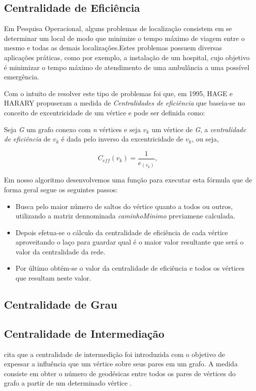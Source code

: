 \documentclass[12pt]{article}
\begin{document}
\subsection{Centralidade de Eficiência}
Em  Pesquisa  Operacional,  alguns  problemas  de  localização  consistem  em  se determinar um local de modo que minimize o tempo máximo de viagem entre o mesmo e todas as demais localizações.Estes problemas possuem diversas aplicações práticas, como  por  exemplo,  a  instalação  de  um  hospital,  cujo objetivo  é  minimizar  o  tempo máximo de atendimento de uma ambulância a uma possível emergência\cite{freitas}.

Com o intuito de resolver este tipo de problemas foi que, em 1995,  HAGE e HARARY propuseram a medida de {\it Centralidades de eficiência} que baseia-se no conceito de excentricidade de um vértice e pode ser definida como: 

    Seja  {\it G} um grafo conexo com {\it n} vértices  e seja $v_k$ um vértice de {\it G}, a {\it centralidade de eficiência} de $v_k$ é dada pelo inverso da excentricidade de $v_k$, ou seja,
\begin{center}
\begin{equation}
C_{eff}(v_k)= \frac{1}{e_{(v_k)}},
\end{equation}
\end{center}
    Em nosso algoritmo desenvolvemos uma função para executar esta fórmula que de forma geral segue os seguintes passos:
\begin{itemize}
\item Busca pelo maior número de saltos do vértice quanto a todos ou outros, utilizando a matriz dennominada {\it caminhoMinimo} previamene calculada.
\item Depois efetua-se o cálculo da centralidade de eficiência de cada vértice aproveitando o laço para guardar qual é o maior valor resultante que será o valor da centralidade da rede.
\item Por último obtém-se o valor da centralidade de eficiência e todos os vértices que resultam neste valor. 
\end{itemize}    
\subsection{Centralidade de Grau}
\subsection{Centralidade de Intermediação}
\cite{freitas} cita que a centralidade de intermedição foi introduzida com o objetivo de expessar a influência que um vértice sobre seus pares em um grafo.
A medida consiste em obter o número de geodésicas entre todos os pares de vértices do grafo a partir de um determinado vértice \cite{freitas}.
\end{document}
